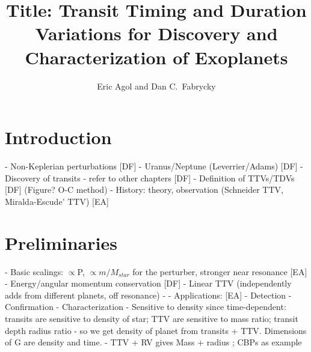 \documentclass[graybox,natbib,nosecnum]{svmult}
\begin{document}
\title*{Title: Transit Timing and Duration Variations for Discovery and Characterization of Exoplanets}
\author{Eric Agol and Dan C.\ Fabrycky}
%
%
\maketitle



\section{Introduction}

  - Non-Keplerian perturbations [DF]
  - Uranus/Neptune (Leverrier/Adams) [DF]
  - Discovery of transits - refer to other chapters [DF]
  - Definition of TTVs/TDVs [DF] (Figure? O-C method)
     \citep{2005Sci...307.1288H,2010Sci...330...51H}
  - History: theory, observation  (Schneider TTV, Miralda-Escude' TTV) [EA]
     \citep{2002ApJ...564.1019M,2010Sci...330...51H}
\section{Preliminaries}

  - Basic scalings: $\propto$P, $\propto m/M_{star}$ for the perturber, stronger near resonance [EA]
  - Energy/angular momentum conservation [DF]
  - Linear TTV (independently adds from different planets, off resonance)  - 
  - Applications: [EA]
    - Detection
    - Confirmation
    - Characterization
      - Sensitive to density since time-dependent: transits are sensitive to density of star; TTV are sensitive to mass ratio; transit depth radius ratio - so we get density of planet from transits + TTV.   Dimensions of G are density and time.
      - TTV + RV gives Mass + radius ;   CBPs as example  
\end{document}
